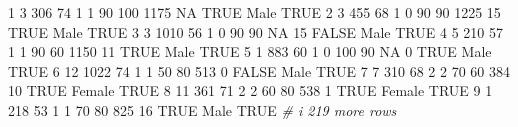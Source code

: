 \documentclass[
]{article}
\newenvironment{Shaded}{\begin{snugshade}}{\end{snugshade}}
\newcommand{\CommentTok}[1]{\textcolor[rgb]{0.56,0.35,0.01}{\textit{#1}}}
\newcommand{\ConstantTok}[1]{\textcolor[rgb]{0.56,0.35,0.01}{#1}}
\newcommand{\DecValTok}[1]{\textcolor[rgb]{0.00,0.00,0.81}{#1}}
\newcommand{\NormalTok}[1]{#1}
\begin{document}
\begin{Shaded}
\begin{Highlighting}[]
\DecValTok{1}     \DecValTok{3}   \DecValTok{306}    \DecValTok{74}     \DecValTok{1}       \DecValTok{1}       \DecValTok{90}       \DecValTok{100}     \DecValTok{1175}      \ConstantTok{NA} \ConstantTok{TRUE}\NormalTok{  Male   }\ConstantTok{TRUE}           
\DecValTok{2}     \DecValTok{3}   \DecValTok{455}    \DecValTok{68}     \DecValTok{1}       \DecValTok{0}       \DecValTok{90}        \DecValTok{90}     \DecValTok{1225}      \DecValTok{15} \ConstantTok{TRUE}\NormalTok{  Male   }\ConstantTok{TRUE}           
\DecValTok{3}     \DecValTok{3}  \DecValTok{1010}    \DecValTok{56}     \DecValTok{1}       \DecValTok{0}       \DecValTok{90}        \DecValTok{90}       \ConstantTok{NA}      \DecValTok{15} \ConstantTok{FALSE}\NormalTok{ Male   }\ConstantTok{TRUE}           
\DecValTok{4}     \DecValTok{5}   \DecValTok{210}    \DecValTok{57}     \DecValTok{1}       \DecValTok{1}       \DecValTok{90}        \DecValTok{60}     \DecValTok{1150}      \DecValTok{11} \ConstantTok{TRUE}\NormalTok{  Male   }\ConstantTok{TRUE}           
\DecValTok{5}     \DecValTok{1}   \DecValTok{883}    \DecValTok{60}     \DecValTok{1}       \DecValTok{0}      \DecValTok{100}        \DecValTok{90}       \ConstantTok{NA}       \DecValTok{0} \ConstantTok{TRUE}\NormalTok{  Male   }\ConstantTok{TRUE}           
\DecValTok{6}    \DecValTok{12}  \DecValTok{1022}    \DecValTok{74}     \DecValTok{1}       \DecValTok{1}       \DecValTok{50}        \DecValTok{80}      \DecValTok{513}       \DecValTok{0} \ConstantTok{FALSE}\NormalTok{ Male   }\ConstantTok{TRUE}           
\DecValTok{7}     \DecValTok{7}   \DecValTok{310}    \DecValTok{68}     \DecValTok{2}       \DecValTok{2}       \DecValTok{70}        \DecValTok{60}      \DecValTok{384}      \DecValTok{10} \ConstantTok{TRUE}\NormalTok{  Female }\ConstantTok{TRUE}           
\DecValTok{8}    \DecValTok{11}   \DecValTok{361}    \DecValTok{71}     \DecValTok{2}       \DecValTok{2}       \DecValTok{60}        \DecValTok{80}      \DecValTok{538}       \DecValTok{1} \ConstantTok{TRUE}\NormalTok{  Female }\ConstantTok{TRUE}           
\DecValTok{9}     \DecValTok{1}   \DecValTok{218}    \DecValTok{53}     \DecValTok{1}       \DecValTok{1}       \DecValTok{70}        \DecValTok{80}      \DecValTok{825}      \DecValTok{16} \ConstantTok{TRUE}\NormalTok{  Male   }\ConstantTok{TRUE}           
\CommentTok{\# i 219 more rows}
\end{Highlighting}
\end{Shaded}
\end{document}
